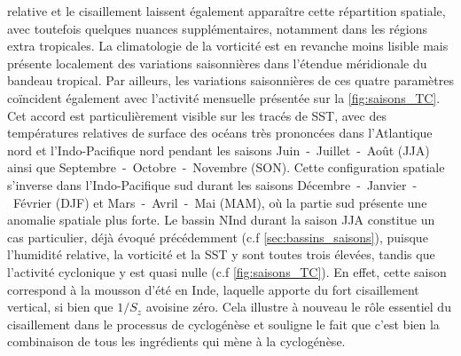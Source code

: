 \documentclass[../main.tex]{subfiles}
\begin{document}
relative et le cisaillement laissent également apparaître cette répartition spatiale, avec toutefois quelques nuances supplémentaires, notamment dans les
régions extra tropicales. La climatologie de la vorticité est en revanche moins lisible mais présente localement des variations saisonnières dans l'étendue
méridionale du bandeau tropical. Par ailleurs, les variations saisonnières de ces quatre paramètres coïncident également avec l'activité mensuelle présentée sur
la \cref{fig:saisons_TC}. Cet accord est particulièrement visible sur les tracés de SST, avec des températures relatives de surface des océans très prononcées
dans l'Atlantique nord et l'Indo-Pacifique nord pendant les saisons Juin~-~Juillet~-~Août (JJA) ainsi que
Septembre~-~Octobre~-~Novembre (SON). Cette configuration spatiale s'inverse dans l'Indo-Pacifique sud durant les saisons Décembre~-~Janvier~-~Février (DJF) et
Mars~-~Avril~-~Mai (MAM), où la partie sud présente une anomalie spatiale plus forte. Le bassin NInd durant la saison JJA constitue un cas particulier, déjà
évoqué précédemment (c.f \cref{sec:bassins_saisons}), puisque l'humidité relative, la vorticité et la SST y sont toutes trois élevées, tandis que l'activité
cyclonique y est quasi nulle (c.f \cref{fig:saisons_TC}). En effet, cette saison correspond à la mousson d'été en Inde, laquelle apporte du fort cisaillement
vertical, si bien que $1/S_z$ avoisine zéro. Cela illustre à nouveau le rôle essentiel du cisaillement dans le processus de cyclogénèse et
souligne le fait que c'est bien la combinaison de tous les ingrédients qui mène à la cyclogénèse.
\end{document}
